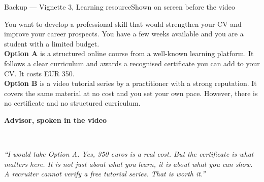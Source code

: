 \documentclass[aspectratio=169,10pt]{beamer}
\newcommand{\panelhead}[1]{\noindent\colorbox{kncyan}{\parbox{0.96\textwidth}{\centering\vspace{1pt}\color{white}\scriptsize\bfseries #1\vspace{1pt}}}\\[0.25em]}
\begin{document}
\begin{frame}{Backup — Vignette 3, Learning resource}{Shown on screen before the video}
  \vspace{0.4em}
  \noindent\colorbox{knlight}{\parbox{0.975\textwidth}{\vspace{3pt}\scriptsize
  You want to develop a professional skill that would strengthen your CV and improve your career prospects. You have a few weeks available and you are a student with a limited budget.\\[0.5em]
  \textbf{Option A} is a structured online course from a well-known learning platform. It follows a clear curriculum and awards a recognised certificate you can add to your CV. It costs EUR 350.\\[0.5em]
  \textbf{Option B} is a video tutorial series by a practitioner with a strong reputation. It covers the same material at no cost and you set your own pace. However, there is no certificate and no structured curriculum.\vspace{3pt}}}
  \vspace{0.8em}

  \panelhead{Advisor, spoken in the video}
  \noindent\colorbox{knpale}{\parbox{0.975\textwidth}{\vspace{3pt}\scriptsize\itshape
  ``I would take Option A. Yes, 350 euros is a real cost. But the certificate is what matters here. It is not just about what you learn, it is about what you can show. A recruiter cannot verify a free tutorial series. That is worth it.''\vspace{3pt}}}
\end{frame}
\end{document}
